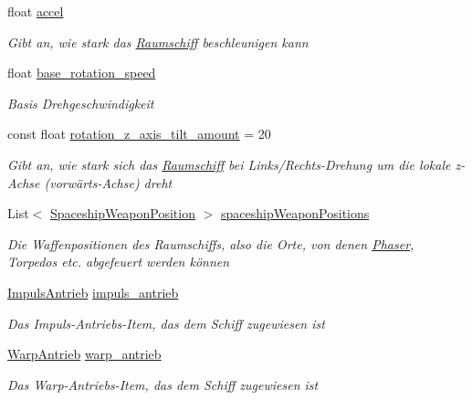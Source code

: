 \begin{DoxyCompactItemize}
float \hyperlink{class_spaceship_a28d8649c7000f2f6626f88663b4248be}{accel}
\begin{DoxyCompactList}\small\item\em Gibt an, wie stark das \hyperlink{class_raumschiff}{Raumschiff} beschleunigen kann \end{DoxyCompactList}\item 
float \hyperlink{class_spaceship_a8c2becac0f8d20fcb380a1e79b196131}{base\+\_\+rotation\+\_\+speed}
\begin{DoxyCompactList}\small\item\em Basis Drehgeschwindigkeit \end{DoxyCompactList}\item 
const float \hyperlink{class_spaceship_a1322e387e2296dbc3b47323f095d98fa}{rotation\+\_\+z\+\_\+axis\+\_\+tilt\+\_\+amount} = 20
\begin{DoxyCompactList}\small\item\em Gibt an, wie stark sich das \hyperlink{class_raumschiff}{Raumschiff} bei Links/\+Rechts-\/\+Drehung um die lokale z-\/\+Achse (vorwärts-\/\+Achse) dreht \end{DoxyCompactList}\item 
List$<$ \hyperlink{class_spaceship_weapon_position}{Spaceship\+Weapon\+Position} $>$ \hyperlink{class_spaceship_a3da1d2ff9be863bb80ea7fa2a6c3db06}{spaceship\+Weapon\+Positions}
\begin{DoxyCompactList}\small\item\em Die Waffenpositionen des Raumschiffs, also die Orte, von denen \hyperlink{class_phaser}{Phaser}, Torpedos etc. abgefeuert werden können \end{DoxyCompactList}\item 
\hyperlink{class_impuls_antrieb}{Impuls\+Antrieb} \hyperlink{class_spaceship_a2f4055a6f9d52ba2ec599e86280f5325}{impuls\+\_\+antrieb}
\begin{DoxyCompactList}\small\item\em Das Impuls-\/\+Antriebs-\/\+Item, das dem Schiff zugewiesen ist \end{DoxyCompactList}\item 
\hyperlink{class_warp_antrieb}{Warp\+Antrieb} \hyperlink{class_spaceship_a79ee5cdccdede956de6eae9a1619ccbc}{warp\+\_\+antrieb}
\begin{DoxyCompactList}\small\item\em Das Warp-\/\+Antriebs-\/\+Item, das dem Schiff zugewiesen ist \end{DoxyCompactList}\item 

\end{DoxyCompactItemize}

